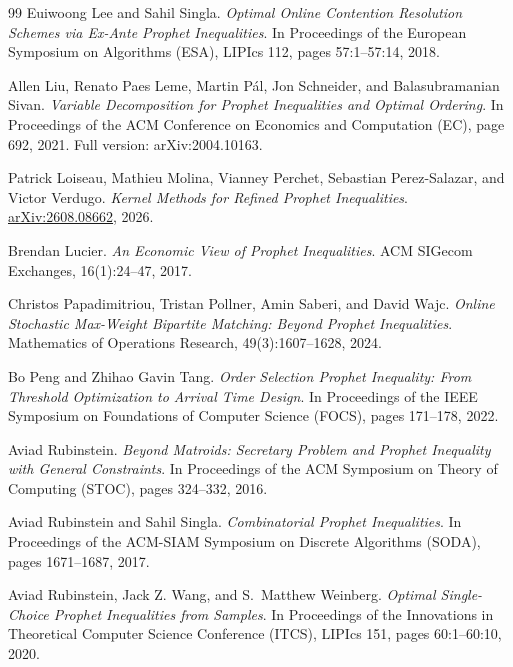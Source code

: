 \documentclass[11pt]{article}
\theoremstyle{definition}
\theoremstyle{remark}
\begin{document}
\begin{thebibliography}{99}
Euiwoong Lee and Sahil Singla.
\emph{Optimal Online Contention Resolution Schemes via Ex-Ante Prophet Inequalities}.
In Proceedings of the European Symposium on Algorithms (ESA), LIPIcs 112, pages 57:1--57:14, 2018.

Allen Liu, Renato Paes Leme, Martin P\'al, Jon Schneider, and Balasubramanian Sivan.
\emph{Variable Decomposition for Prophet Inequalities and Optimal Ordering}.
In Proceedings of the ACM Conference on Economics and Computation (EC), page 692, 2021. Full version: arXiv:2004.10163.

Patrick Loiseau, Mathieu Molina, Vianney Perchet, Sebastian Perez-Salazar, and Victor Verdugo.
\emph{Kernel Methods for Refined Prophet Inequalities}.
\href{https://arxiv.org/abs/2608.08662}{arXiv:2608.08662}, 2026.

Brendan Lucier.
\emph{An Economic View of Prophet Inequalities}.
ACM SIGecom Exchanges, 16(1):24--47, 2017.

Christos Papadimitriou, Tristan Pollner, Amin Saberi, and David Wajc.
\emph{Online Stochastic Max-Weight Bipartite Matching: Beyond Prophet Inequalities}.
Mathematics of Operations Research, 49(3):1607--1628, 2024.

Bo Peng and Zhihao Gavin Tang.
\emph{Order Selection Prophet Inequality: From Threshold Optimization
to Arrival Time Design}. In Proceedings of the IEEE Symposium on Foundations of Computer Science (FOCS), pages 171--178, 2022.

Aviad Rubinstein.
\emph{Beyond Matroids: Secretary Problem and Prophet Inequality with General Constraints}.
In Proceedings of the ACM Symposium on Theory of Computing (STOC), pages 324--332, 2016.

Aviad Rubinstein and Sahil Singla.
\emph{Combinatorial Prophet Inequalities}.
In Proceedings of the ACM-SIAM Symposium on Discrete Algorithms (SODA), pages 1671--1687, 2017.

Aviad Rubinstein, Jack Z. Wang, and S.~Matthew Weinberg.
\emph{Optimal Single-Choice Prophet Inequalities from Samples}.
In Proceedings of the Innovations in Theoretical Computer Science Conference (ITCS), LIPIcs 151, pages 60:1--60:10, 2020.


\end{thebibliography}
\end{document}
